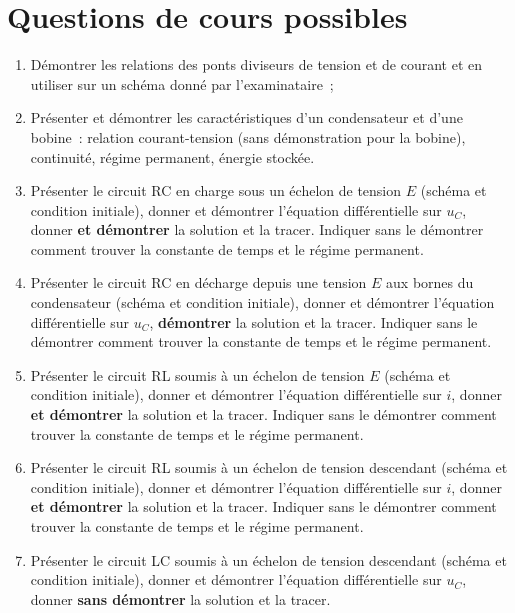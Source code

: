 \documentclass[a4paper, 12pt, final, garamond]{book}
\begin{document}
\section{Questions de cours possibles}
\begin{enumerate}
    \item Démontrer les relations des ponts diviseurs de tension et de courant
        et en utiliser sur un schéma donné par l'examinataire~;
    \item Présenter et démontrer les caractéristiques d'un condensateur et d'une
        bobine~: relation courant-tension (sans démonstration pour la bobine),
        continuité, régime permanent, énergie stockée.
    \item Présenter le circuit RC en charge sous un échelon de tension $E$
        (schéma et condition initiale), donner et démontrer l'équation
        différentielle sur $u_C$, donner \textbf{et démontrer} la solution et la
        tracer. Indiquer sans le démontrer comment trouver la constante de temps
        et le régime permanent.
    \item Présenter le circuit RC en décharge depuis une tension $E$ aux bornes
        du condensateur (schéma et condition initiale), donner et démontrer
        l'équation différentielle sur $u_C$, \textbf{démontrer} la solution et
        la tracer. Indiquer sans le démontrer comment trouver la constante de
        temps et le régime permanent.
    \item Présenter le circuit RL soumis à un échelon de tension $E$ (schéma et
        condition initiale), donner et démontrer l'équation différentielle sur
        $i$, donner \textbf{et démontrer} la solution et la tracer. Indiquer
        sans le démontrer comment trouver la constante de temps et le régime
        permanent.
    \item Présenter le circuit RL soumis à un échelon de tension descendant
        (schéma et condition initiale), donner et démontrer l'équation
        différentielle sur $i$, donner \textbf{et démontrer} la solution et la
        tracer. Indiquer sans le démontrer comment trouver la constante de temps
        et le régime permanent.
    \item Présenter le circuit LC soumis à un échelon de tension descendant
        (schéma et condition initiale), donner et démontrer l'équation
        différentielle sur $u_C$, donner \textbf{sans démontrer} la solution et
        la tracer.
\end{enumerate}
\end{document}
